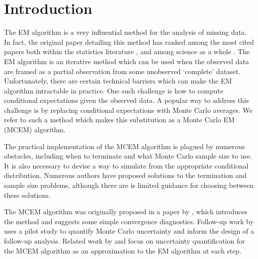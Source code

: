 \documentclass[ss]{imsart}
\theoremstyle{plain}
\theoremstyle{definition}
\theoremstyle{remark}
\begin{document}
\section{Introduction}

The EM algorithm \citep{Dem77} is a very influential method for the analysis of missing data. In fact, the original paper detailing this method has ranked among the most cited papers both within the statistics literature \citep{Rya05}, and among science as a whole \citep{Van14}. The EM algorithm is an iterative method which can be used when the observed data are framed as a partial observation from some unobserved `complete' dataset. Unfortunately, there are certain technical barriers which can make the EM algorithm intractable in practice. One such challenge is how to compute conditional expectations given the observed data. A popular way to address this challenge is by replacing conditional expectations with Monte Carlo averages. We refer to such a method which makes this substitution as a Monte Carlo EM (MCEM) algorithm.

The practical implementation of the MCEM algorithm is plagued by numerous obstacles, including when to terminate and what Monte Carlo sample size to use. It is also necessary to devise a way to simulate from the appropriate conditional distribution. Numerous authors have proposed solutions to the termination and sample size problems, although there are is limited guidance for choosing between these solutions.


The MCEM algorithm was originally proposed in a paper by \citet{Wei90}, which introduces the method and suggests some simple convergence diagnostics. Follow-up work by \citet{Cha95} uses a pilot study to quantify Monte Carlo uncertainty and inform the design of a follow-up analysis. Related work by \citet{Boo99} and \citet{Caf05} focus on uncertainty quantification for the MCEM algorithm as an approximation to the EM algorithm at each step.
\end{document}
